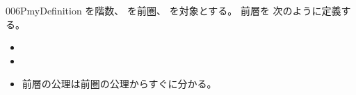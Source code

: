 \documentclass[index]{subfiles}
\begin{document}
\begin{myBlock}{006P}{myDefinition}
  を階数、
  を前圏、
  を対象とする。
  前層を
  次のように定義する。
  \begin{itemize}
  \item {}
  \item {}
  \item 前層の公理は前圏の公理からすぐに分かる。
  \end{itemize}
\end{myBlock}
\end{document}
